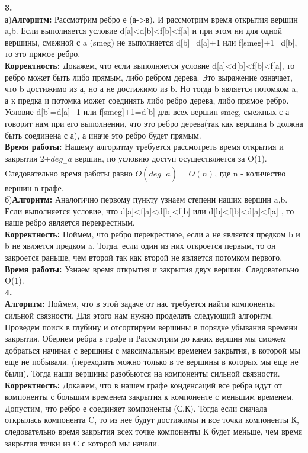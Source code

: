 \documentclass[a4paper,12pt]{article}
\begin{document}
\textbf{3.}\\
а)\textbf{Алгоритм:} Рассмотрим ребро е (а->в). И рассмотрим время открытия вершин a,b.  Если выполняется условие d[a]<d[b]<f[b]<f[a] и при этом ни для одной вершины, смежной с a (smeg) не выполняется d[b]=d[a]+1 или f[smeg]+1=d[b], то это прямое ребро.\\
\textbf{Корректность:}  Докажем, что если выполняется условие d[a]<d[b]<f[b]<f[a], то ребро может быть либо прямым, либо ребром дерева. Это выражение означает, что b достижимо из а, но а не достижимо из b. Но тогда b является потомком a, а к предка и потомка может соединять либо ребро дерева, либо прямое ребро.  Условие d[b]=d[a]+1 или f[smeg]+1=d[b] для всех вершин smeg, смежных с а говорит нам при его выполнении, что это ребро дерева(так как вершина b должна быть соединена с а), а иначе это ребро будет прямым.\\
\textbf{Время работы:} Нашему алгоритму требуется рассмотреть время открытия и закрытия 2+$deg_+ a$ вершин, по условию доступ осуществляется за O(1). Cледовательно время работы равно $O(deg_+a)=O(n)$, где n - количество вершин в графе.
\\
б)\textbf{Алгоритм:} Аналогично первому пункту узнаем степени наших вершин a,b. Если выполняется условие, что d[a]<f[a]<d[b]<f[b] или d[b]<f[b]<d[a]<f[a] , то наше ребро является перекрестным.\\
\textbf{Корректность:} Поймем, что ребро перекрестное, если а не является предком b и b не является предком a. Тогда, если один из них откроется первым, то он закроется раньше, чем второй так как второй не является потомком первого.
\textbf{Время работы:} Узнаем время открытия и закрытия двух вершин. Следовательно O(1).\\
\textbf{4.}\\
\textbf{Алгоритм:} Поймем, что в этой задаче от нас требуется найти компоненты сильной связности. Для этого нам нужно проделать следующий алгоритм. Проведем поиск в глубину и отсортируем вершины в порядке убывания времени закрытия. Обернем ребра в графе и Рассмотрим до каких вершин мы сможем добраться начиная с вершины с максимальным временем закрытия, в которой мы еще не побывали. (переходить можно только в те вершины в которых мы еще не были). Тогда наши вершины разобьются на компоненты сильной связности.\\
\textbf{Корректность:} Докажем, что в нашем графе конденсаций все ребра идут от компоненты с большим временем закрытия к компоненте с меньшим временем.\\
Допустим, что ребро е соединяет компоненты (С,К). Тогда если сначала открылась компонента C, то из нее будут достижимы и все точки компоненты К, следовательно время закрытия всех точке компоненты К будет меньше, чем время закрытия точки из С с которой мы начали. \\
\end{document}
